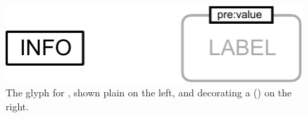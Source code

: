 \begin{glyphDescription}
\glyphAux
{}

\end{glyphDescription}

\begin{figure}[H]
  \centering
  \includegraphics{images/unitInformation}
  \caption{The \PD glyph for , shown plain on the left, and decorating a  () on the right.}
  \label{fig:unitInfo}
\end{figure}

